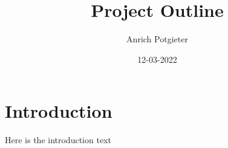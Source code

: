 \documentclass[12pt]{article}
\title{Project Outline}
\author{Anrich Potgieter}
\date{12-03-2022}
\begin{document}
\maketitle
\section{Introduction}
Here is the introduction text
\end{document}
